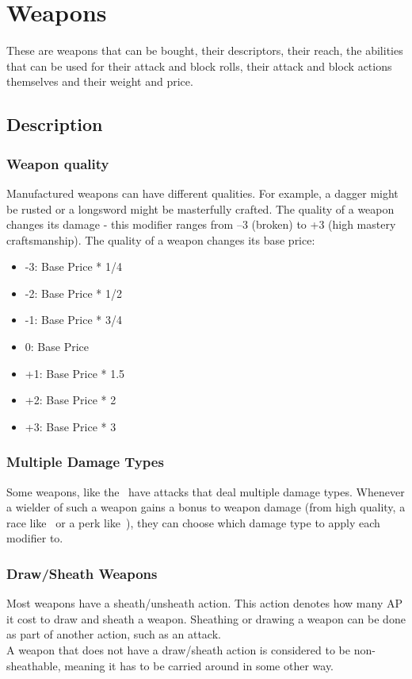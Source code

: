 \chapter{Weapons}\label{ch:weapons}
These are weapons that can be bought, their descriptors, their reach, the abilities that can be used for their attack and block rolls, their attack and block actions themselves and their weight and price.\\
\section{Description}\label{sec:weaponDescription}
\subsection{Weapon quality}\label{subsec:weaponQuality}
Manufactured weapons can have different qualities.
For example, a dagger might be rusted or a longsword might be masterfully crafted.
The quality of a weapon changes its damage - this modifier ranges from --3 (broken) to +3 (high mastery craftsmanship).
The quality of a weapon changes its base price:\\

\begin{itemize}
    \item -3: Base Price * 1/4
    \item -2: Base Price * 1/2
    \item -1: Base Price * 3/4
    \item 0: Base Price
    \item +1: Base Price * 1.5
    \item +2: Base Price * 2
    \item +3: Base Price * 3
\end{itemize}

\subsection{Multiple Damage Types}\label{subsec:multipleDamageTypeWeapons}
Some weapons, like the~ have attacks that deal multiple damage types.
Whenever a wielder of such a weapon gains a bonus to weapon damage (from high quality, a race like~ or a perk like~), they can choose which damage type to apply each modifier to.

\subsection{Draw/Sheath Weapons}\label{subsec:sheathWeapons}
Most weapons have a sheath/unsheath action.
This action denotes how many AP it cost to draw and sheath a weapon.
Sheathing or drawing a weapon can be done as part of another action, such as an attack.\\
A weapon that does not have a draw/sheath action is considered to be non-sheathable, meaning it has to be carried around in some other way.

